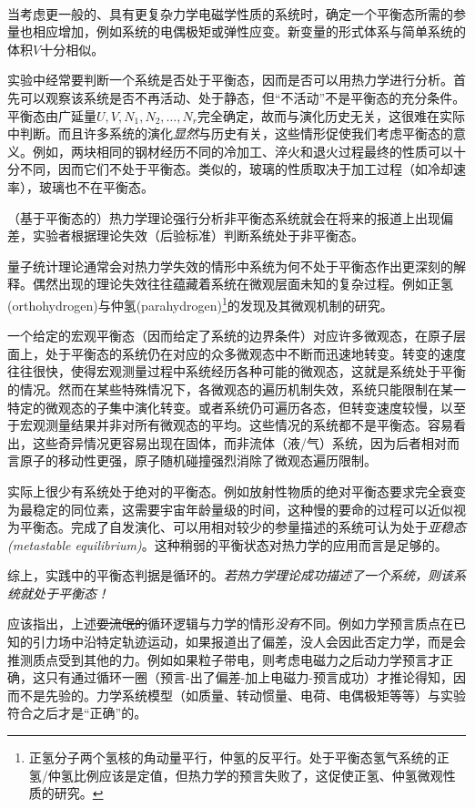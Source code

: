 \ 

当考虑更一般的、具有更复杂力学电磁学性质的系统时，确定一个平衡态所需的参量也相应增加，例如系统的电偶极矩或弹性应变。新变量的形式体系与简单系统的体积$V$十分相似。

实验中经常要判断一个系统是否处于平衡态，因而是否可以用热力学进行分析。首先可以观察该系统是否不再活动、处于静态，但“不活动”不是平衡态的充分条件。平衡态由广延量$U, V, N_1, N_2, \dots, N_r$完全确定，故而与演化历史无关，这很难在实际中判断。而且许多系统的演化{\it 显然}与历史有关，这些情形促使我们考虑平衡态的意义。例如，两块相同的钢材经历不同的冷加工、淬火和退火过程最终的性质可以十分不同，因而它们不处于平衡态。类似的，玻璃的性质取决于加工过程（如冷却速率），玻璃也不在平衡态。

（基于平衡态的）热力学理论强行分析非平衡态系统就会在将来的报道上出现偏差，实验者根据理论失效（后验标准）判断系统处于非平衡态。

量子统计理论通常会对热力学失效的情形中系统为何不处于平衡态作出更深刻的解释。偶然出现的理论失效往往蕴藏着系统在微观层面未知的复杂过程。例如正氢(orthohydrogen)与仲氢(parahydrogen)\footnote{正氢分子两个氢核的角动量平行，仲氢的反平行。处于平衡态氢气系统的正氢/仲氢比例应该是定值，但热力学的预言失败了，这促使正氢、仲氢微观性质的研究。}的发现及其微观机制的研究。

一个给定的宏观平衡态（因而给定了系统的边界条件）对应许多微观态，在原子层面上，处于平衡态的系统仍在对应的众多微观态中不断而迅速地转变。转变的速度往往很快，使得宏观测量过程中系统经历各种可能的微观态，这就是系统处于平衡的情况。然而在某些特殊情况下，各微观态的遍历机制失效，系统只能限制在某一特定的微观态的子集中演化转变。或者系统仍可遍历各态，但转变速度较慢，以至于宏观测量结果并非对所有微观态的平均。这些情况的系统都不是平衡态。容易看出，这些奇异情况更容易出现在固体，而非流体（液/气）系统，因为后者相对而言原子的移动性更强，原子随机碰撞强烈消除了微观态遍历限制。

实际上很少有系统处于绝对的平衡态。例如放射性物质的绝对平衡态要求完全衰变为最稳定的同位素，这需要宇宙年龄量级的时间，这种慢的要命的过程可以近似视为平衡态。完成了自发演化、可以用相对较少的参量描述的系统可认为处于{\it 亚稳态 (metastable equilibrium)}。这种稍弱的平衡状态对热力学的应用而言是足够的。

综上，实践中的平衡态判据是循环的。{\it 若热力学理论成功描述了一个系统，则该系统就处于平衡态！}

应该指出，上述\sout{耍流氓的}循环逻辑与力学的情形{\it 没有}不同。例如力学预言质点在已知的引力场中沿特定轨迹运动，如果报道出了偏差，没人会因此否定力学，而是会推测质点受到其他的力。例如如果粒子带电，则考虑电磁力之后动力学预言才正确，这只有通过循环一圈（预言-出了偏差-加上电磁力-预言成功）才推论得知，因而不是先验的。力学系统模型（如质量、转动惯量、电荷、电偶极矩等等）与实验符合之后才是“正确”的。

